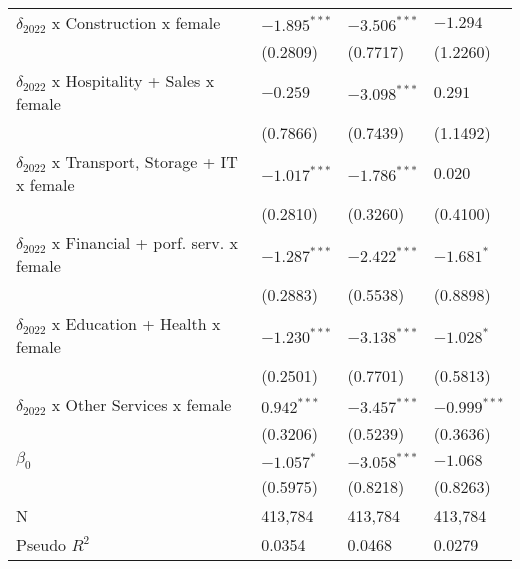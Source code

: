 \begin{tabular}{llll}
$\delta_{2022}$ x Construction x female            &     $-1.895^{***}$ &     $-3.506^{***}$ &           $-1.294$ \\
                                                   &           (0.2809) &           (0.7717) &           (1.2260) \\
$\delta_{2022}$ x Hospitality + Sales x female     &           $-0.259$ &     $-3.098^{***}$ &            $0.291$ \\
                                                   &           (0.7866) &           (0.7439) &           (1.1492) \\
$\delta_{2022}$ x Transport, Storage + IT x female &     $-1.017^{***}$ &     $-1.786^{***}$ &            $0.020$ \\
                                                   &           (0.2810) &           (0.3260) &           (0.4100) \\
$\delta_{2022}$ x Financial + porf. serv. x female &     $-1.287^{***}$ &     $-2.422^{***}$ &         $-1.681^*$ \\
                                                   &           (0.2883) &           (0.5538) &           (0.8898) \\
$\delta_{2022}$ x Education + Health x female      &     $-1.230^{***}$ &     $-3.138^{***}$ &         $-1.028^*$ \\
                                                   &           (0.2501) &           (0.7701) &           (0.5813) \\
$\delta_{2022}$ x Other Services x female          &      $0.942^{***}$ &     $-3.457^{***}$ &     $-0.999^{***}$ \\
                                                   &           (0.3206) &           (0.5239) &           (0.3636) \\
$\beta_0$                                          &         $-1.057^*$ &     $-3.058^{***}$ &           $-1.068$ \\
                                                   &           (0.5975) &           (0.8218) &           (0.8263) \\
N                                                  &            413,784 &            413,784 &            413,784 \\
Pseudo $R^2$                                       &             0.0354 &             0.0468 &             0.0279 \\
\bottomrule
\end{tabular}
